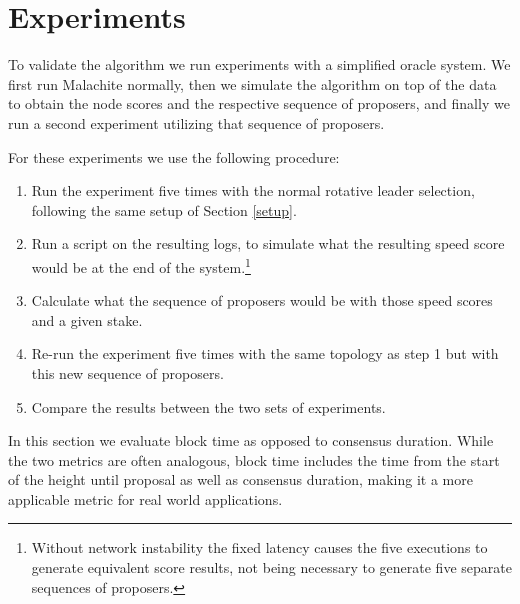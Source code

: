 

\section{Experiments}
\label{alg-exp}

To validate the algorithm we run experiments with a simplified oracle system. We first run Malachite normally, then we simulate the algorithm on top of the data to obtain the node scores and the respective sequence of proposers, and finally we run a second experiment utilizing that sequence of proposers. 

For these experiments we use the following procedure:

\begin{enumerate}
    \item Run the experiment five times with the normal rotative leader selection, following the same setup of Section \ref{setup}.
    \item Run a script on the resulting logs, to simulate what the resulting speed score would be at the end of the system.\footnote{Without network instability the fixed latency causes the five executions to generate equivalent score results, not being necessary to generate five separate sequences of proposers.}
    \item Calculate what the sequence of proposers would be with those speed scores and a given stake.
    \item Re-run the experiment five times with the same topology as step 1 but with this new sequence of proposers.
    \item Compare the results between the two sets of experiments.
\end{enumerate}

In this section we evaluate block time as opposed to consensus duration. While the two metrics are often analogous, block time includes the time from the start of the height until proposal as well as consensus duration, making it a more applicable metric for real world applications. 

